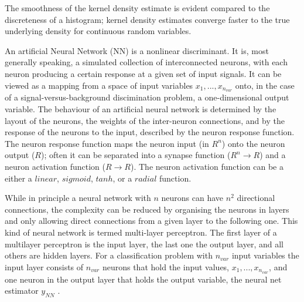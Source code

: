 The smoothness of the kernel density estimate is evident compared to the discreteness of a histogram; kernel density estimates converge faster to the true underlying density for continuous random variables.


An artificial Neural Network (NN) is a nonlinear discriminant. It is, most generally speaking, a simulated collection of interconnected neurons, with each neuron producing a certain response at a given set of input signals. It can be viewed as a mapping from a space of input variables $x_1,...,x_{n_{var}}$ onto, in the case of a signal-versus-background discimination problem, a one-dimensional output variable. The behaviour of an artificial neural network is determined by the layout of the neurons, the weights of the inter-neuron connections, and by the response of the neurons to the input, described by the neuron response function.  %
The neuron response function maps the neuron input (in $R^n$) onto the neuron output ($R$); often it can be separated into a synapse function ($R^n \rightarrow R$) and a neuron activation function ($R \rightarrow R$). The neuron activation function can be a either a $linear$, $sigmoid$, $tanh$, or a $radial$ function.

While in principle a neural network with $n$ neurons can have $n^2$ directional connections, the complexity can be reduced by organising the neurons in layers and only allowing direct connections from a given layer to the following one. This kind of neural network is termed multi-layer perceptron. The first layer of a multilayer perceptron is the input layer, the last one the output layer, and all others are hidden layers. For a classification problem with $n_{var}$ input variables the input layer consists of $n_{var}$ neurons that hold the input values, $x_1,...,x_{n_{var}}$, and one neuron in the output layer that holds the output variable, the neural net estimator $y_{NN}$ .


